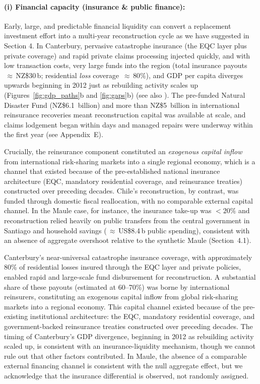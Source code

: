 \documentclass[12pt]{article}
\begin{document}
\paragraph{(i) Financial capacity (insurance \& public finance):}
Early, large, and predictable financial liquidity can convert a replacement investment effort into a multi-year reconstruction cycle as we have suggested in Section 4. In Canterbury, pervasive catastrophe insurance (the EQC layer plus private coverage) and rapid private claims processing injected quickly, and with low transaction costs, very large funds into the region (total insurance payouts $\,\approx\,$NZ\$30\,b; residential \emph{loss} coverage $\,\approx\,80\%$), and GDP per capita diverges upwards beginning in 2012 just as rebuilding activity scales up (Figures~\ref{fig:gdp_paths}b and \ref{fig:gaps}b) (see also \cite{nguyen2020insurance, parker2016five}). The pre-funded Natural Disaster Fund (NZ\$6.1~billion) and more than NZ\$5~billion in international reinsurance recoveries meant reconstruction capital was available at scale, and claims lodgement began within days and managed repairs were underway within the first year (see Appendix~E). 

Crucially, the reinsurance component constituted an \textit{exogenous capital inflow} from international risk-sharing markets into a single regional economy, which is a channel that existed because of the pre-established national insurance architecture (EQC, mandatory residential coverage, and reinsurance treaties) constructed over preceding decades. Chile's reconstruction, by contrast, was funded through domestic fiscal reallocation, with no comparable external capital channel. In the Maule case, for instance, the insurance take-up was \(<20\%\) and reconstruction relied heavily on public transfers from the central government in Santiago and household savings ($\,\approx\,$US\$8.4\,b public spending), consistent with an absence of aggregate overshoot relative to the synthetic Maule (Section~4.1).

Canterbury's near-universal catastrophe insurance coverage, with approximately 80\% of residential losses insured through the EQC layer and private policies, enabled rapid and large-scale fund disbursement for reconstruction. A substantial share of these payouts (estimated at 60–70\%) was borne by international reinsurers, constituting an exogenous capital inflow from global risk-sharing markets into a regional economy. This capital channel existed because of the pre-existing institutional architecture: the EQC, mandatory residential coverage, and government-backed reinsurance treaties constructed over preceding decades. The timing of Canterbury's GDP divergence, beginning in 2012 as rebuilding activity scaled up, is consistent with an insurance-liquidity mechanism, though we cannot rule out that other factors contributed. In Maule, the absence of a comparable external financing channel is consistent with the null aggregate effect, but we acknowledge that the insurance differential is observed, not randomly assigned.
\end{document}
